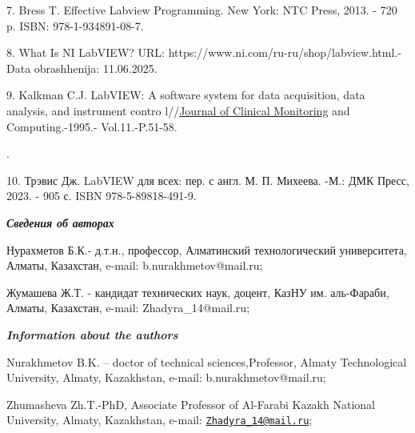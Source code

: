 7. Bress T. Effective Labview Programming. New York: NTC Press, 2013. -
720 p. ISBN: 978-1-934891-08-7.

8. What Is NI LabVIEW? URL: https://www.ni.com/ru-ru/shop/labview.html.-
Data obrashhenija: 11.06.2025.

9. Kalkman C.J. LabVIEW: A software system for data acquisition, data
analysis, and instrument contro
l//\href{https://link.springer.com/journal/10877}{Journal of Clinical
Monitoring} and Computing.-1995.- Vol.11.-P.51-58.

.

10. Трэвис Дж. LabVIEW для всех: пер. с англ. М. П. Михеева. -М.: ДМК
Пресс, 2023. - 905 с. ISBN 978-5-89818-491-9.

\emph{{\bfseries Сведения об авторах}}

Нурахметов Б.К.- д.т.н., профессор, Алматинский технологический
университета, Алматы, Казахстан, e-mail: b.nurakhmetov@mail.ru;

Жумашева Ж.Т. - кандидат технических наук, доцент, КазНУ им. аль-Фараби,
Алматы, Казахстан, e-mail: Zhadyra\_14@mail.ru;

\emph{{\bfseries Information about the authors}}

Nurakhmetov B.K. -- doctor of technical sciences,Professor, Almaty
Technological University, Almaty, Kazakhstan, e-mail:
b.nurakhmetov@mail.ru;

Zhumasheva Zh.T.-PhD, Associate Professor of Al-Farabi Kazakh National
University, Almaty, Kazakhstan, e-mail:
\href{mailto:Zhadyra_14@mail.ru}{\nolinkurl{Zhadyra\_14@mail.ru}};\